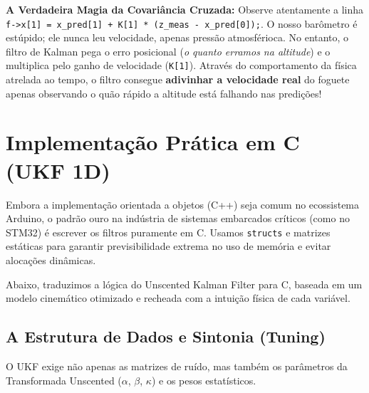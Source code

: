 \documentclass[12pt,a4paper]{article}
\begin{document}
\textbf{A Verdadeira Magia da Covariância Cruzada:} Observe atentamente a linha \texttt{f->x[1] = x\_pred[1] + K[1] * (z\_meas - x\_pred[0]);}. O nosso barômetro é estúpido; ele nunca leu velocidade, apenas pressão atmosférioca. No entanto, o filtro de Kalman pega o erro posicional (\textit{o quanto erramos na altitude}) e o multiplica pelo ganho de velocidade (\texttt{K[1]}). Através do comportamento da física atrelada ao tempo, o filtro consegue \textbf{adivinhar a velocidade real} do foguete apenas observando o quão rápido a altitude está falhando nas predições!

\section{Implementação Prática em C (UKF 1D)}

Embora a implementação orientada a objetos (C++) seja comum no ecossistema Arduino, o padrão ouro na indústria de sistemas embarcados críticos (como no STM32) é escrever os filtros puramente em C. Usamos \texttt{structs} e matrizes estáticas para garantir previsibilidade extrema no uso de memória e evitar alocações dinâmicas.

Abaixo, traduzimos a lógica do Unscented Kalman Filter para C, baseada em um modelo cinemático otimizado e recheada com a intuição física de cada variável.

\subsection{A Estrutura de Dados e Sintonia (Tuning)}
O UKF exige não apenas as matrizes de ruído, mas também os parâmetros da Transformada Unscented ($\alpha$, $\beta$, $\kappa$) e os pesos estatísticos.
\end{document}
